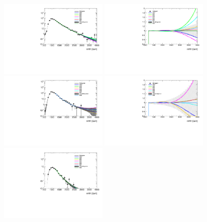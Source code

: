 \begin{figure}[htbp!]
\begin{center}
\includegraphics[angle=270, width=0.48\textwidth]{figures/boosted/Syst_Smooth/smoothFuncCompare_22_comp.pdf}
\includegraphics[angle=270, width=0.48\textwidth]{figures/boosted/Syst_Smooth/smoothFuncCompare_22_comp_ratio.pdf} \\
\includegraphics[angle=270, width=0.48\textwidth]{figures/boosted/Syst_Smooth/smoothFuncCompare_33_comp.pdf}
\includegraphics[angle=270, width=0.48\textwidth]{figures/boosted/Syst_Smooth/smoothFuncCompare_33_comp_ratio.pdf} \\
\includegraphics[angle=270, width=0.48\textwidth]{figures/boosted/Syst_Smooth/smoothFuncCompare_44_comp.pdf}

\end{center}
\end{figure}
